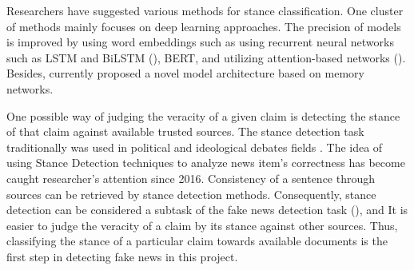 Researchers have suggested various methods for stance classification. One cluster of methods mainly focuses on deep learning approaches. The precision of models is improved by using word embeddings such as using recurrent neural networks such as LSTM and BiLSTM (\cite{stanceCI}), \ac{BERT}, and utilizing attention-based networks (\cite{stanceCI}). Besides, \cite{memory_network} currently proposed a novel model architecture based on memory networks.

One possible way of judging the veracity of a given claim is detecting the stance of that claim against available trusted sources. The stance detection task traditionally was used in political and ideological debates fields \citep{stance_robust}. The idea of using Stance Detection techniques to analyze news item's correctness has become caught researcher's attention since 2016. Consistency of a sentence through sources can be retrieved by stance detection methods. Consequently, stance detection can be considered a subtask of the fake news detection task (\cite{book_datafake}), and It is easier to judge  the veracity of a claim by its stance against other sources. Thus, classifying the stance of a particular claim towards available documents is the first step in detecting fake news in this project. 
